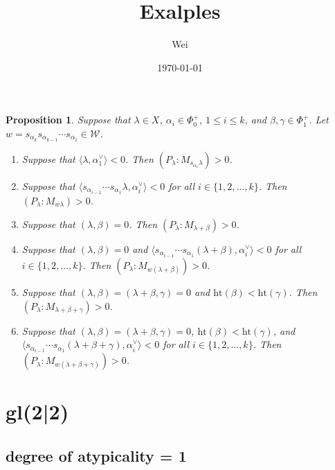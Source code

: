 \documentclass[12pt,a4paper]{article}
\title{Exalples  }
\author{Wei}
\date{\today}
\makeatletter
\renewcommand{\maketitle}{
    \begin{center}
        \vspace*{-1cm}  %
        {\LARGE\bfseries \@title \par}
        \vspace{0.2cm}  %
        {\large \@author }
        {\normalsize \@date \par}
        \vspace{1cm}    %
    \end{center}
}
\newtheorem{proposition}[theorem]{Proposition}
\makeatother
\begin{document}
\maketitle
\begin{proposition} \label{prop:1}
Suppose that $\lambda \in X$, $\alpha_i \in \Phi_0^+$, $1 \leq i \leq k$, and $\beta, \gamma \in \Phi_1^+$. Let $w = s_{\alpha_k} s_{\alpha_{k-1}} \cdots s_{\alpha_1} \in \mathcal{W}$.

\begin{enumerate}
    \item Suppose that $\langle \lambda, \alpha_1^\vee \rangle < 0$. Then $(P_\lambda : M_{s_{\alpha_1}\lambda}) > 0$.
    
    \item Suppose that $\langle s_{\alpha_{i-1}} \cdots s_{\alpha_1} \lambda, \alpha_i^\vee \rangle < 0$ for all $i \in \{1,2,\ldots,k\}$. Then $(P_\lambda : M_{w\lambda}) > 0$.
    
    \item Suppose that $(\lambda, \beta) = 0$. Then $(P_\lambda : M_{\lambda + \beta}) > 0$.
    
    \item Suppose that $(\lambda, \beta) = 0$ and $\langle s_{\alpha_{i-1}} \cdots s_{\alpha_1} (\lambda + \beta), \alpha_i^\vee \rangle < 0$ for all $i \in \{1,2,\ldots,k\}$. Then $(P_\lambda : M_{w(\lambda + \beta)}) > 0$.
    
    \item Suppose that $(\lambda, \beta) = (\lambda + \beta, \gamma) = 0$ and $\mathrm{ht}(\beta) < \mathrm{ht}(\gamma)$. Then $(P_\lambda : M_{\lambda + \beta + \gamma}) > 0$.
    
    \item Suppose that $(\lambda, \beta) = (\lambda + \beta, \gamma) = 0$, $\mathrm{ht}(\beta) < \mathrm{ht}(\gamma)$, and $\langle s_{\alpha_{i-1}} \cdots s_{\alpha_1} (\lambda + \beta + \gamma), \alpha_i^\vee \rangle < 0$ for all $i \in \{1,2,\ldots,k\}$. Then $(P_\lambda : M_{w(\lambda + \beta + \gamma)}) > 0$.
\end{enumerate}
\end{proposition}


\section{gl(2|2)}
\subsection{degree of atypicality = 1}
\end{document}
